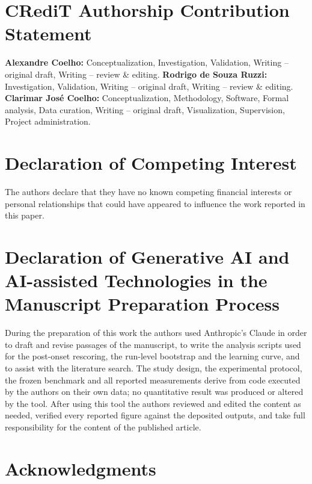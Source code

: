 \documentclass[10pt,twocolumn,a4paper]{article}
\begin{document}
\section*{CRediT Authorship Contribution Statement}

\textbf{Alexandre Coelho:} Conceptualization, Investigation, Validation,
Writing -- original draft, Writing -- review \& editing.
\textbf{Rodrigo de Souza Ruzzi:} Investigation, Validation, Writing -- original draft,
Writing -- review \& editing.
\textbf{Clarimar Jos\'e Coelho:} Conceptualization, Methodology, Software,
Formal analysis, Data curation, Writing -- original draft, Visualization,
Supervision, Project administration.

\section*{Declaration of Competing Interest}

The authors declare that they have no known competing financial interests or
personal relationships that could have appeared to influence the work reported
in this paper.

\section*{Declaration of Generative AI and AI-assisted Technologies in the
Manuscript Preparation Process}

During the preparation of this work the authors used Anthropic's Claude in
order to draft and revise passages of the manuscript, to write the analysis
scripts used for the post-onset rescoring, the run-level bootstrap and the
learning curve, and to assist with the literature search. The study design, the
experimental protocol, the frozen benchmark and all reported measurements
derive from code executed by the authors on their own data; no quantitative
result was produced or altered by the tool. After using this tool the authors
reviewed and edited the content as needed, verified every reported figure
against the deposited outputs, and take full responsibility for the content of
the published article.

\section*{Acknowledgments}
\end{document}
